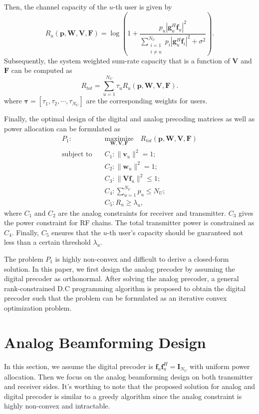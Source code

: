 \documentclass[10pt,journal,twocolumn,twoside]{IEEEtran}
\begin{document}
Then, the channel capacity of the $u$-th user is given by
\begin{equation}\label{eq:6}
R_u(\bm{p},\bm{W},\bm{V}, \bm{F}) = \log\left(1+\frac{p_u|{\bm{g}}_{u}^H \bm{f}_u|^2}{\sum_{\substack{i=1 \\ i\neq u}}^{N_U}p_i|{\bm{g}}_{u}^H\bm{f}_i|^2+\sigma^2}\right).
\end{equation}
Subsequently, the system weighted sum-rate capacity that is a function of ${\bm V}$ and ${\bm F}$ can be computed as
\begin{equation}
R_{tot}=\sum_{u=1}^{N_U} \tau_uR_u(\bm{p},\bm{W},\bm{V}, \bm{F}).
\end{equation}
where $\bm{\tau} = \left[\tau_1, \tau_2, \cdots, \tau_{N_U}\right]$ are the corresponding weights for users.

Finally, the optimal design of the digital and analog precoding matrices as well as power allocation can be formulated as
\begin{align}\label{eq:maxsumrate}
P_1: \quad&\underset{\bm W, \bm{V},\bm F}{\text{maximize}}\quad R_{tot}(\bm{p},\bm{W}, \bm{V}, \bm{F})\\ 
\text{subject to} \quad&C_1: \|\bm{v}_{u}\|^2=1; \nonumber\\
&C_2: \|\bm{w}_{u}\|^2=1;\nonumber\\
&C_3: \|\bm{V} \bm{f}_u\|^2 \leq 1;\nonumber\\
&C_4: \sum_{u=1}^{N_U}p_{u} \leq N_U;\nonumber\\
&C_5: R_{u}\geq \lambda_{u}, \nonumber
\end{align}
where $C_1$ and $C_2$ are the analog constraints for receiver and transmitter. $C_3$ gives the power constraint for RF chains. The total transmitter power is constrained as $C_4$. Finally, $C_5$ ensures that the $u$-th user's capacity should be guaranteed not less than a certain threshold $\lambda_{u}$.

The problem $P_1$ is highly non-convex and difficult to derive a closed-form solution. In this paper, we first design the analog precoder by assuming the digital precoder as orthonormal. After solving the analog precoder, a general rank-constrained D.C programming algorithm is proposed to obtain the digital precoder such that the problem can be formulated as an iterative convex optimization problem. 

\section{Analog Beamforming Design}\label{analog}
In this section, we  assume the digital precoder is $\bm{f}_u\bm{f}_u^H = \bm{I}_{N_U}$ with uniform power allocation. Then we focus on the analog beamforming design on both transmitter and receiver sides. It's worthing to note that the proposed solution for analog and digital precoder is similar to a greedy algorithm since the analog constraint is highly non-convex and intractable.
\end{document}
